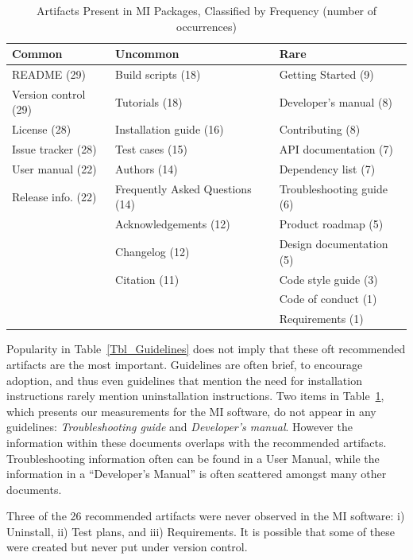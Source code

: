 \documentclass[doubleblind,12pt, 3p, times]{elsarticle}
\begin{document}
\begin{table}[ht!]
    \begin{center}
    \begin{tabular}{ p{3.8 cm} p{6.4 cm} p{4.5 cm}}
    \toprule
    Common & Uncommon & Rare \\
    \midrule
    README (29) & Build scripts (18) & Getting Started (9)\\
    Version control (29) & Tutorials (18) & Developer's manual (8)\\
    License (28) & Installation guide (16) & Contributing (8)\\
    Issue tracker (28) & Test cases (15) & API documentation (7)\\
    User manual (22) & Authors (14) & Dependency list (7)\\
    Release info. (22) & Frequently Asked Questions (14) & Troubleshooting guide (6)\\
     & Acknowledgements (12) & Product roadmap (5)\\
     & Changelog (12) & Design documentation (5)\\
     & Citation (11) & Code style guide (3)\\
     & & Code of conduct (1)\\
     & & Requirements (1)\\
    \bottomrule
    \end{tabular}
    \caption{Artifacts Present in MI Packages, Classified by Frequency
    (number of occurrences)}
    \label{artifactspresent}
    \end{center}
\end{table}

Popularity in Table~\ref{Tbl_Guidelines} does not imply that these oft
recommended artifacts are the most important. Guidelines are often brief, to
encourage adoption, and thus even guidelines that mention the need for
installation instructions rarely mention uninstallation instructions.  Two items
in Table~\ref{artifactspresent}, which presents our measurements for the MI
software, do not appear in any guidelines: \emph{Troubleshooting guide} and
\emph{Developer's manual}.  However the information within these documents
overlaps with the recommended artifacts.  Troubleshooting information often can
be found in a User Manual, while the information in a ``Developer's Manual'' is
often scattered amongst many other documents.

Three of the 26 recommended artifacts were never observed in the MI software:
i) Uninstall, ii) Test plans, and iii) Requirements. It is possible that
some of these were created but never put under version control.
\end{document}

